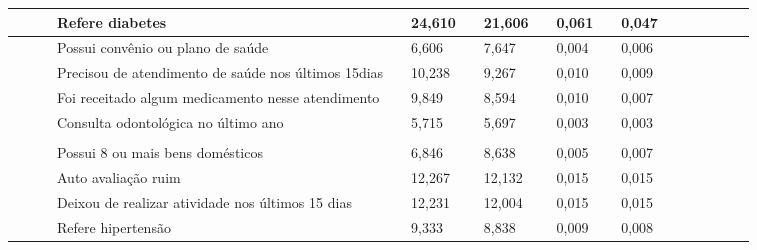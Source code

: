 \documentclass{article}
\begin{document}
\begin{tabular}{| l | l | l | l | l | l || l | l | l | l || l | l | l | l | l | l | l | l |}
 & 
 & %
 & Refere diabetes
 & %
 & 24,610
 & %
 & 21,606
 & %
 & 0,061
 & %
 & 0,047
\\ \hline 

 & 
 & %
 & Possui convênio ou plano de saúde
 & %
 & 6,606
 & %
 & 7,647
 & %
 & 0,004
 & %
 & 0,006
\\ \hline 

 & 
 & %
 & Precisou de atendimento de saúde nos últimos 15dias
 & %
 & 10,238
 & %
 & 9,267
 & %
 & 0,010
 & %
 & 0,009
\\ \hline 

 & 
 & %
 & Foi receitado algum medicamento nesse atendimento
 & %
 & 9,849
 & %
 & 8,594
 & %
 & 0,010
 & %
 & 0,007
\\ \hline 

 & 
 & %
 & Consulta odontológica no último ano
 & %
 & 5,715
 & %
 & 5,697
 & %
 & 0,003
 & %
 & 0,003
\\ \hline 

 & \multirow{1}{*}{\multicolumn{2}{l}{Adultos e idosos}}
 & %
 & 
 & %
 & 
 & %
 & 
\\ \hline 

 & 
 & %
 & Possui 8 ou mais bens domésticos
 & %
 & 6,846
 & %
 & 8,638
 & %
 & 0,005
 & %
 & 0,007
\\ \hline 

 & 
 & %
 & Auto avaliação ruim
 & %
 & 12,267
 & %
 & 12,132
 & %
 & 0,015
 & %
 & 0,015
\\ \hline 

 & 
 & %
 & Deixou de realizar atividade nos últimos 15 dias
 & %
 & 12,231
 & %
 & 12,004
 & %
 & 0,015
 & %
 & 0,015
\\ \hline 

 & 
 & %
 & Refere hipertensão
 & %
 & 9,333
 & %
 & 8,838
 & %
 & 0,009
 & %
 & 0,008
\\ \hline 


\end{tabular}
\end{document}
